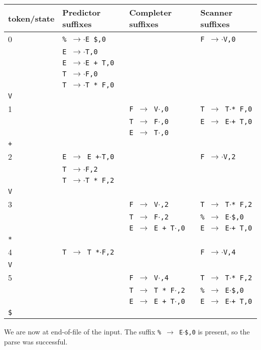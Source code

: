 \documentclass[11pt]{article}
\def\ra{\rightarrow}
\begin{document}
\begin{tabular}{|l|l|l|l|}
\hline
token/state & Predictor suffixes & Completer suffixes & Scanner suffixes\\
\hline
0     & \texttt{\% $\ra$$\cdot$E \$,0} & & \texttt{F $\ra$$\cdot$V,0}\\
      & \texttt{E $\ra$$\cdot$T,0} & & \\
      & \texttt{E $\ra$$\cdot$E + T,0} & & \\
      & \texttt{T $\ra$$\cdot$F,0} & & \\
      & \texttt{T $\ra$$\cdot$T * F,0} & & \\
\hline
\texttt{V} &  & &\\
\hline
1     &  & \texttt{F $\ra$ V$\cdot$,0}& \texttt{T $\ra$ T$\cdot$* F,0} \\
      &  & \texttt{T $\ra$ F$\cdot$,0}& \texttt{E $\ra$ E$\cdot$+ T,0} \\
      &  & \texttt{E $\ra$ T$\cdot$,0}& \\
\hline
\texttt{+} &  & &\\
\hline
2     & \texttt{E $\ra$ E +$\cdot$T,0} & & \texttt{F $\ra$$\cdot$V,2}\\
      & \texttt{T $\ra$$\cdot$F,2} & & \\
      & \texttt{T $\ra$$\cdot$T * F,2} & & \\
\hline 
\texttt{V} & & &\\
\hline
3     &  &  \texttt{F $\ra$ V$\cdot$,2}& \texttt{T $\ra$ T$\cdot$* F,2}\\
      &  &  \texttt{T $\ra$ F$\cdot$,2}& \texttt{\% $\ra$ E$\cdot$\$,0}\\
      &  &  \texttt{E $\ra$ E + T$\cdot$,0}& \texttt{E $\ra$ E$\cdot$+ T,0}\\
\hline
\texttt{*} & & & \\
\hline
4     & \texttt{T $\ra$ T *$\cdot$F,2} & & \texttt{F $\ra$$\cdot$V,4}\\
\hline
\texttt{V} & & &\\
\hline
5     & & \texttt{F $\ra$ V$\cdot$,4} & \texttt{T $\ra$ T$\cdot$* F,2}\\
      & & \texttt{T $\ra$ T * F$\cdot$,2} & \texttt{\% $\ra$ E$\cdot$\$,0}\\
      & & \texttt{E $\ra$ E + T$\cdot$,0} & \texttt{E $\ra$ E$\cdot$+ T,0}\\
\hline
\texttt{\$} &  & &\\
\hline
\end{tabular}

We are now at end-of-file of the input.  The suffix \texttt{\% $\ra$
  E$\cdot$\$,0} is present, so the parse was successful. 
\end{document}
